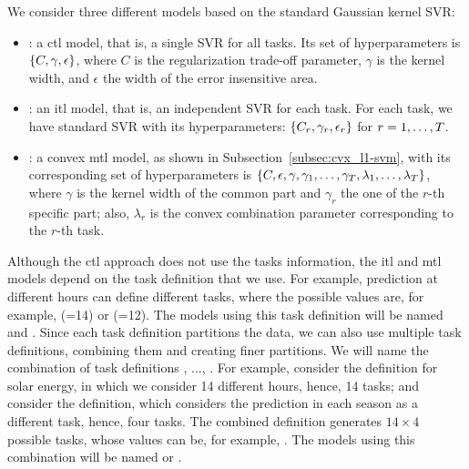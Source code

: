 %
We consider three different models based on the standard Gaussian kernel SVR:
\begin{itemize}
    \item {}: a \acrshort{ctl} model, that is, a single SVR for all tasks. Its set of hyperparameters is $\left\{C, \gamma, \epsilon\right\}$, where $C$ is the regularization trade-off parameter, $\gamma$ is the kernel width, and $\epsilon$ the width of the error insensitive area.
    \item {}: an \acrshort{itl} model, that is, an independent SVR for each task. For each task, we have standard SVR with its hyperparameters: $\left\{C_r, \gamma_r, \epsilon_r\right\}$ for $r=1, \ldots, T$.
    \item {}: a convex \acrshort{mtl} model, as shown in Subsection~\ref{subsec:cvx_l1-svm}, with its corresponding set of hyperparameters is $\left\{C, \epsilon, \gamma, \gamma_1, \ldots, \gamma_T, \lambda_1, \ldots, \lambda_T\right\}$, where $\gamma$ is the kernel width of the common part and $\gamma_r$ the one of the $r$-th specific part; also, $\lambda_r$ is the convex combination parameter corresponding to the $r$-th task.
\end{itemize}
%
Although the \acrshort{ctl} approach does not use the tasks information, the \acrshort{itl} and \acrshort{mtl} models depend on the task definition that we use. For example, prediction at different hours can define different tasks, where the possible values are, for example, (=14) or (=12). The models using this task definition will be named  and . 
%
Since each task definition partitions the data, we can also use multiple task definitions, combining them and creating finer partitions. 
We will name  the combination of task definitions , ..., . For example, consider the  definition for solar energy, in which we consider 14 different hours, hence, 14 tasks; and consider the  definition, which considers the prediction in each season as a different task, hence, four tasks. The combined definition  generates $14 \times 4$ possible tasks, whose values can be, for example, .
The models using this combination will be named  or .

